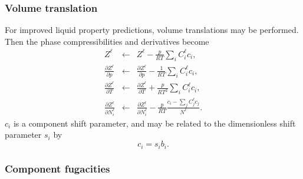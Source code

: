 
\subsubsection{Volume translation}

For improved liquid property predictions, volume translations may be
performed. Then the phase compressibilities and derivatives become
\begin{eqnarray}
  Z^\ell & \leftarrow & Z^\ell - \frac{p}{RT} \sum_i C_i^\ell c_i, \\
  \frac{\partial Z^\ell}{\partial p} & \leftarrow &
  \frac{\partial Z^\ell}{\partial p} - \frac{1}{RT}
  \sum_i C_i^\ell c_i, \\
  \frac{\partial Z^\ell}{\partial T} & \leftarrow &
  \frac{\partial Z^\ell}{\partial T} + \frac{p}{RT^2}
  \sum_i C_i^\ell c_i, \\
  \frac{\partial Z^\ell}{\partial N_i^\ell} & \leftarrow &
  \frac{\partial Z^\ell}{\partial N_i^\ell} -
  \frac{p}{RT} \frac{c_i - \sum_j C_j^\ell c_j}{N^\ell}.
\end{eqnarray}
$c_i$ is a component shift parameter, and may be related to the
dimensionless shift parameter $s_i$ by
\begin{equation}
  c_i = s_i b_i.
\end{equation}


\subsubsection{Component fugacities}

